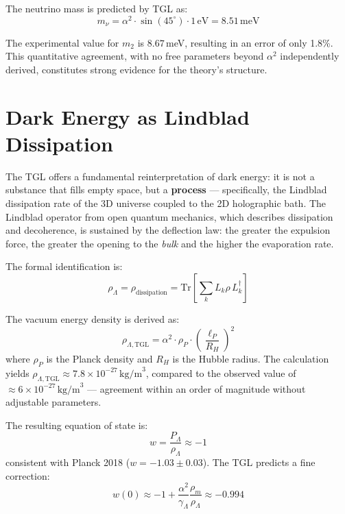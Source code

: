 \documentclass[12pt,a4paper,twoside]{article}
\newcommand{\alphaii}{\alpha^{2}}
\newcommand{\bulk}{\textit{bulk}}
\begin{document}
The neutrino mass is predicted by TGL as:
\begin{equation}
m_\nu = \alphaii \cdot \sin(45^\circ) \cdot 1\,\text{eV} = 8.51\,\text{meV}
\label{eq:massa_nu}
\end{equation}

The experimental value for $m_2$ is $8.67$\,meV, resulting in an error of only 1.8\%. This quantitative agreement, with no free parameters beyond $\alphaii$ independently derived, constitutes strong evidence for the theory's structure.


\section{Dark Energy as Lindblad Dissipation}


The TGL offers a fundamental reinterpretation of dark energy: it is not a substance that fills empty space, but a \textbf{process} --- specifically, the Lindblad dissipation rate of the 3D universe coupled to the 2D holographic bath. The Lindblad operator from open quantum mechanics, which describes dissipation and decoherence, is sustained by the deflection law: the greater the expulsion force, the greater the opening to the \bulk{} and the higher the evaporation rate.

The formal identification is:
\begin{equation}
\boxed{\rho_\Lambda = \rho_{\text{dissipation}} = \text{Tr}\!\left[\sum_k L_k \rho\, L_k^\dagger\right]}
\label{eq:dark_energy}
\end{equation}

The vacuum energy density is derived as:
\begin{equation}
\rho_{\Lambda,\text{TGL}} = \alphaii \cdot \rho_P \cdot \left(\frac{\ell_P}{R_H}\right)^{\!2}
\label{eq:rho_lambda}
\end{equation}
where $\rho_P$ is the Planck density and $R_H$ is the Hubble radius. The calculation yields $\rho_{\Lambda,\text{TGL}} \approx 7.8 \times 10^{-27}\,\text{kg/m}^3$, compared to the observed value of $\approx 6 \times 10^{-27}\,\text{kg/m}^3$ --- agreement within an order of magnitude without adjustable parameters.

The resulting equation of state is:
\begin{equation}
w = \frac{P_\Lambda}{\rho_\Lambda} \approx -1
\label{eq:w}
\end{equation}
consistent with Planck 2018 ($w = -1.03 \pm 0.03$). The TGL predicts a fine correction:
\begin{equation}
w(0) \approx -1 + \frac{\alphaii}{\gamma_\Lambda}\frac{\rho_m}{\rho_\Lambda} \approx -0.994
\label{eq:w_correcao}
\end{equation}
\end{document}
